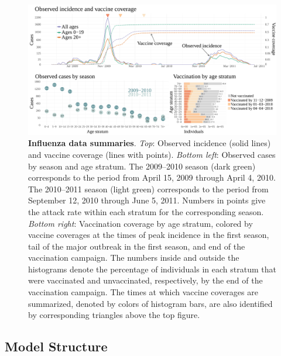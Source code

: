 \begin{figure}
	\centering
	\includegraphics[width=\linewidth]{figures/fludat_plots}
	\caption[A(H1N1)pdm09 incidence and vaccination data from Finland, April 15, 2009 --- June 5, 2011.]{\textbf{Influenza data summaries}. \textit{Top}: Observed incidence (solid lines) and vaccine coverage (lines with points). \textit{Bottom left}: Observed cases by season and age stratum. The 2009--2010 season (dark green) corresponds to the period from April 15, 2009 through April 4, 2010. The 2010--2011 season (light green) corresponds to the period from September 12, 2010 through June 5, 2011. Numbers in points give the attack rate within each stratum for the corresponding season. \textit{Bottom right}: Vaccination coverage by age stratum, colored by vaccine coverages at the times of peak incidence in the first season, tail of the major outbreak in the first season, and end of the vaccination campaign. The numbers inside and outside the histograms denote the percentage of individuals in each stratum that were vaccinated and unvaccinated, respectively, by the end of the vaccination campaign. The times at which vaccine coverages are summarized, denoted by colors of histogram bars, are also identified by corresponding triangles above the top figure.}
	\label{fig:finland_fludat}
\end{figure}

\subsection{Model Structure}
\label{subsec:flu_modstructure}

